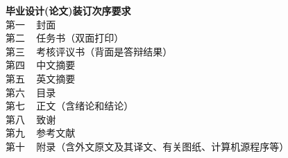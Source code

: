 \noindent \textbf{毕业设计(论文)装订次序要求} \\
第一 ~ 封面 \\
第二 ~ 任务书（双面打印） \\
第三 ~ 考核评议书（背面是答辩结果） \\
第四 ~ 中文摘要 \\
第五 ~ 英文摘要 \\
第六 ~ 目录 \\
第七 ~ 正文（含绪论和结论） \\
第八 ~ 致谢 \\
第九 ~ 参考文献 \\
第十 ~ 附录（含外文原文及其译文、有关图纸、计算机源程序等）